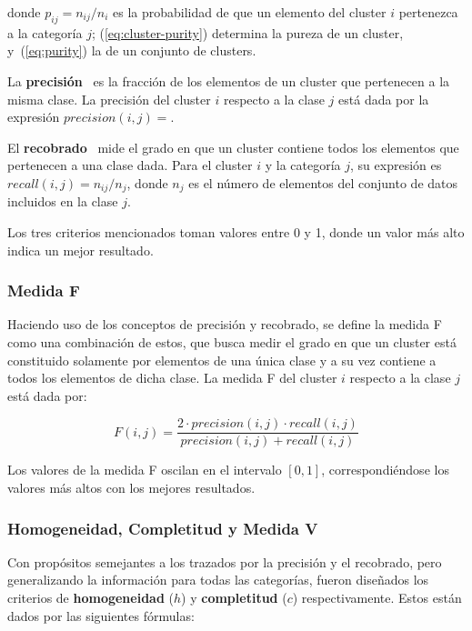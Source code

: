 \noindent
donde  $p_{ij} = n_{ij}/n_i$ es la probabilidad de que un elemento del cluster $i$ pertenezca a la categoría $j$;
(\ref{eq:cluster-purity}) determina la pureza de un cluster, y~(\ref{eq:purity}) la de un conjunto de clusters.

La \textbf{precisión}~\cite{Tan05,Aggarawal13} es la fracción de los elementos de un cluster que pertenecen a la misma clase.
La precisión del cluster $i$ respecto a la clase $j$ está dada por la expresión $precision(i,j) = $.

El \textbf{recobrado}~\cite{Tan05,Aggarawal13} mide el grado en que un cluster contiene todos los elementos que pertenecen a una clase dada.
Para el cluster $i$ y la categoría $j$, su expresión es $recall(i,j) = n_{ij}/n_j$, donde $n_j$ es el número de elementos del conjunto de datos incluidos en la clase $j$.

Los tres criterios mencionados toman valores entre 0 y 1, donde un valor más alto indica un mejor resultado.

\subsubsection{Medida F}

Haciendo uso de los conceptos de precisión y recobrado, se define la medida F~\cite{Tan05,Aggarawal13,Wagner07} como una combinación de estos, que busca medir el grado en que un cluster está constituido solamente por elementos de una única clase y a su vez contiene a todos los elementos de dicha clase.
La medida F del cluster $i$ respecto a la clase $j$ está dada por:

\begin{equation}
    \label{eq:F-measure}
    F(i,j) = \frac{2 \cdot precision(i,j) \cdot recall(i,j)}{precision(i,j) + recall(i,j)}
\end{equation}

Los valores de la medida F oscilan en el intervalo $[0,1]$, correspondiéndose los valores más altos con los mejores resultados.

\subsubsection{Homogeneidad, Completitud y Medida V}

Con propósitos semejantes a los trazados por la precisión y el recobrado, pero generalizando la información para todas las categorías, fueron diseñados los criterios de \textbf{homogeneidad} ($h$) y \textbf{completitud} ($c$) respectivamente.
Estos están dados por las siguientes fórmulas:

